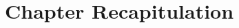 \documentclass[thesis-solanki.tex]{subfiles}
\begin{document}
\section{Chapter Recapitulation}

\ifMain
\begin{scope}
  \nolinenumbers
  \enotesize
  \par
  \begin{singlespace}
  \setlength{\parskip}{12pt plus 2pt minus 1pt}
  \theendnotes
  \par
  \end{singlespace}
\end{scope}
\fi
\end{document}
